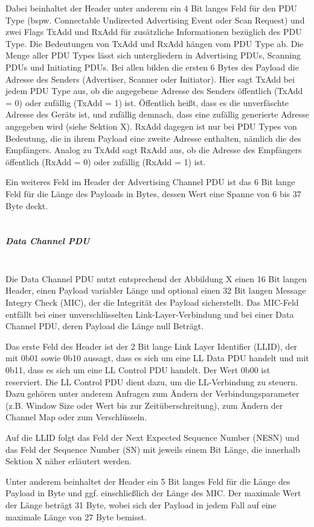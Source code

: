 Dabei beinhaltet der Header unter anderem ein 4 Bit langes Feld für den PDU Type (bspw. Connectable Undirected Advertising Event oder Scan Request) und zwei Flags TxAdd und RxAdd für zusätzliche Informationen bezüglich des PDU Type. Die Bedeutungen von TxAdd und RxAdd hängen vom PDU Type ab. Die Menge aller PDU Types lässt sich untergliedern in Advertising PDUs, Scanning PDUs und Initiating PDUs. Bei allen bilden die ersten 6 Bytes des Payload die Adresse des Senders (Advertiser, Scanner oder Initiator). Hier sagt TxAdd bei jedem PDU Type aus, ob die angegebene Adresse des Senders öffentlich (TxAdd = 0) oder zufällig (TxAdd = 1) ist. Öffentlich heißt, dass es die unverfäschte Adresse des Geräts ist, und zufällig demnach, dass eine zufällig generierte Adresse angegeben wird (siehe Sektion X). 
RxAdd dagegen ist nur bei PDU Types von Bedeutung, die in ihrem Payload eine zweite Adresse enthalten, nämlich die des Empfängers. Analog zu TxAdd sagt RxAdd aus, ob die Adresse des Empfängers öffentlich (RxAdd = 0) oder zufällig (RxAdd = 1) ist.

Ein weiteres Feld im Header der Advertising Channel PDU ist das 6 Bit lange Feld für die Länge des Payloads in Bytes, dessen Wert eine Spanne von 6 bis 37 Byte deckt.
\\\\
\subparagraph{Data Channel PDU} \mbox{} \vspace{0.2cm} \\
Die Data Channel PDU \cite{BtSpec4.0_2208-2209} nutzt entsprechend der Abbildung X 
einen 16 Bit langen Header, einen Payload variabler Länge und optional einen 32 Bit langen Message Integry Check (MIC), der die Integrität des Payload sicherstellt. Das MIC-Feld entfällt bei einer unverschlüsselten Link-Layer-Verbindung und bei einer Data Channel PDU, deren Payload die Länge null Beträgt.

Das erste Feld des Header ist der 2 Bit lange Link Layer Identifier (LLID), der mit 0b01 sowie 0b10 aussagt, dass es sich um eine LL Data PDU handelt und mit 0b11, dass es sich um eine LL Control PDU handelt. Der Wert 0b00 ist reserviert. Die LL Control PDU dient dazu, um die LL-Verbindung zu steuern. Dazu gehören unter anderem Anfragen zum Ändern der Verbindungsparameter (z.B. Window Size oder Wert bis zur Zeitüberschreitung), zum Ändern der Channel Map oder zum Verschlüsseln.

Auf die LLID folgt das Feld der Next Expected Sequence Number (NESN) und das Feld der Sequence Number (SN) mit jeweils einem Bit Länge, die innerhalb Sektion X 
näher erläutert werden.

Unter anderem beinhaltet der Header ein 5 Bit langes Feld für die Länge des Payload in Byte und ggf. einschließlich der Länge des MIC. Der maximale Wert der Länge beträgt 31 Byte, wobei sich der Payload in jedem Fall auf eine maximale Länge von 27 Byte bemisst.